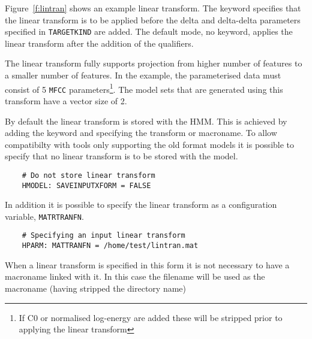 Figure~\ref{f:lintran}  shows an example linear transform. The
 keyword specifies that the linear transform
is to be applied before the delta and delta-delta
parameters specified in \texttt{TARGETKIND} are added. The default
mode, no  keyword, applies the linear transform 
after the addition of the qualifiers.

The linear transform fully supports projection from higher 
number of features to a smaller number of features. In the 
example, the parameterised data must consist of 5 \texttt{MFCC}
parameters\footnote{If C0 or normalised log-energy are added
these will be stripped prior to applying the linear transform}.
The model sets that are generated using this transform have
a vector size of 2.

By default the linear transform is stored with the HMM. This is
achieved by adding the  keyword and specifying the
transform or macroname. To allow compatibilty with tools only
supporting the old format models it is possible to specify that no
linear transform is to be stored with the model. 
\begin{verbatim}
    # Do not store linear transform
    HMODEL: SAVEINPUTXFORM = FALSE
\end{verbatim}
In addition it is possible to specify the linear transform as a
 configuration variable, \texttt{MATRTRANFN}.
\begin{verbatim}
    # Specifying an input linear transform
    HPARM: MATTRANFN = /home/test/lintran.mat
\end{verbatim}
When a linear transform is specified in this form it is not necessary
to have a macroname linked with it. In this case the filename
will be used as the macroname (having stripped the directory name)


